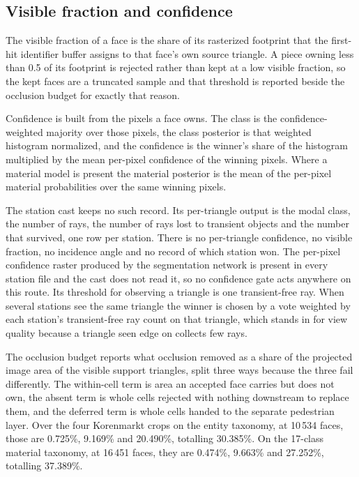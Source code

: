 \documentclass[journal]{IEEEtran}
\begin{document}
\subsection{Visible fraction and confidence}

The visible fraction of a face is the share of its rasterized footprint that the
first-hit identifier buffer assigns to that face's own source triangle. A piece
owning less than 0.5 of its footprint is rejected rather than kept at a low
visible fraction, so the kept faces are a truncated sample and that threshold is
reported beside the occlusion budget for exactly that reason.

Confidence is built from the pixels a face owns. The class is the
confidence-weighted majority over those pixels, the class posterior is that
weighted histogram normalized, and the confidence is the winner's share of the
histogram multiplied by the mean per-pixel confidence of the winning pixels.
Where a material model is present the material posterior is the mean of the
per-pixel material probabilities over the same winning pixels.

The station cast keeps no such record. Its per-triangle output is the modal
class, the number of rays, the number of rays lost to transient objects and the
number that survived, one row per station. There is no per-triangle confidence,
no visible fraction, no incidence angle and no record of which station won. The
per-pixel confidence raster produced by the segmentation network is present in
every station file and the cast does not read it, so no confidence gate acts
anywhere on this route. Its threshold for observing a triangle is one
transient-free ray. When several stations see the same triangle the winner is
chosen by a vote weighted by each station's transient-free ray count on that
triangle, which stands in for view quality because a triangle seen edge on
collects few rays.

The occlusion budget reports what occlusion removed as a share of the projected
image area of the visible support triangles, split three ways because the three
fail differently. The within-cell term is area an accepted face carries but does
not own, the absent term is whole cells rejected with nothing downstream to
replace them, and the deferred term is whole cells handed to the separate
pedestrian layer. Over the four Korenmarkt crops on the entity taxonomy, at
10\,534 faces, those are 0.725\%, 9.169\% and 20.490\%, totalling 30.385\%. On
the 17-class material taxonomy, at 16\,451 faces, they are 0.474\%, 9.663\% and
27.252\%, totalling 37.389\%.
\end{document}
